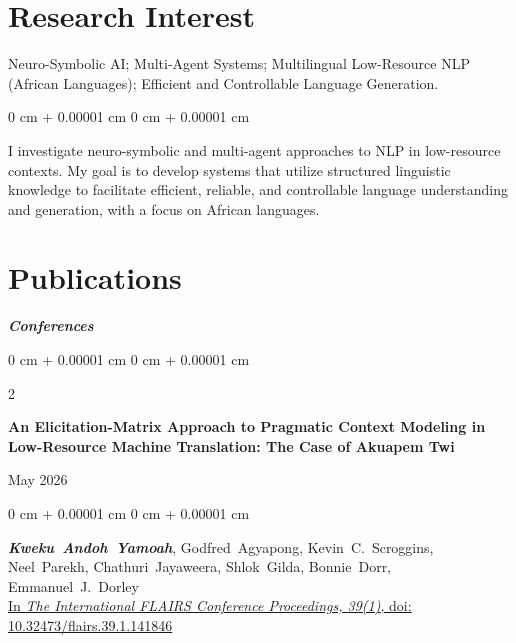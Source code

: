 \documentclass[10pt, letterpaper]{article}
\newenvironment{onecolentry}{
    \begin{adjustwidth}{
        0 cm + 0.00001 cm
    }{
        0 cm + 0.00001 cm
    }
}{
    \end{adjustwidth}
} %
\newenvironment{twocolentry}[2][]{
    \onecolentry
    \def\secondColumn{#2}
    \setcolumnwidth{\fill, 4.5 cm}
    \begin{paracol}{2}
}{
    \switchcolumn \raggedleft \secondColumn
    \end{paracol}
    \endonecolentry
} %
\begin{document}
    \section{Research Interest}
     Neuro-Symbolic AI; Multi-Agent Systems; Multilingual Low-Resource NLP (African Languages); Efficient and Controllable Language Generation.

    \vspace{0.2 cm}

    \begin{onecolentry}
         I investigate neuro-symbolic and multi-agent approaches to NLP in low-resource contexts. My goal is to develop systems that utilize structured linguistic knowledge to facilitate efficient, reliable, and controllable language understanding and generation, with a focus on African languages.
    \end{onecolentry}


    \section{Publications}

        \large \textit{\textbf{Conferences}}
        \vspace{0.10 cm}
        \normalsize

        \vspace{0.20 cm}
        \begin{samepage}
            \begin{twocolentry}
                {May 2026}

                 \textbf{An Elicitation-Matrix Approach to Pragmatic Context Modeling in Low-Resource Machine Translation: The Case of Akuapem Twi}
            \end{twocolentry}

            \vspace{0.10 cm}
            \begin{onecolentry}
                \mbox{\textbf{\textit{Kweku Andoh Yamoah}}}, \mbox{Godfred Agyapong}, \mbox{Kevin C. Scroggins}, \mbox{Neel Parekh}, \mbox{Chathuri Jayaweera}, \mbox{Shlok Gilda}, \mbox{Bonnie Dorr}, \mbox{Emmanuel J. Dorley} \\
                \vspace{0.10 cm}
                \href{https://journals.flvc.org/FLAIRS/article/view/141846/147007}{In \textit{The International FLAIRS Conference Proceedings, 39(1)}, doi: 10.32473/flairs.39.1.141846}
                \end{onecolentry}
        \end{samepage}
\end{document}
